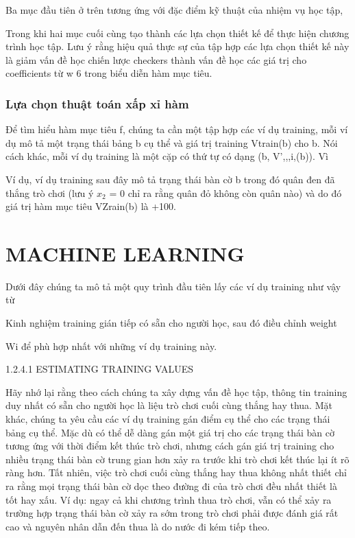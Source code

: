Ba mục đầu tiên ở trên tương ứng với đặc điểm kỹ thuật của nhiệm vụ học tập,

Trong khi hai mục cuối cùng tạo thành các lựa chọn thiết kế để thực hiện chương trình học tập. Lưu ý rằng hiệu quả thực sự của tập hợp các lựa chọn thiết kế này là giảm vấn đề học chiến lược checkers thành vấn đề học các giá trị cho coefficients từ w 6 trong biểu diễn hàm mục tiêu.

\subsubsection{Lựa chọn thuật toán xấp xỉ hàm}

Để tìm hiểu hàm mục tiêu f, chúng ta cần một tập hợp các ví dụ training, mỗi ví dụ mô tả một trạng thái bảng b cụ thể và giá trị training Vtrain(b) cho b. Nói cách khác, mỗi ví dụ training là một cặp có thứ tự có dạng (b, V',,,i,(b)). Vì

Ví dụ, ví dụ training sau đây mô tả trạng thái bàn cờ b trong đó quân đen đã thắng trò chơi (lưu ý $x_{2}$ = 0 chỉ ra rằng quân đỏ không còn quân nào) và do đó giá trị hàm mục tiêu VZrain(b) là +100.

\section{MACHINE LEARNING}

Dưới đây chúng ta mô tả một quy trình đầu tiên lấy các ví dụ training như vậy từ

Kinh nghiệm training gián tiếp có sẵn cho người học, sau đó điều chỉnh weight

Wi để phù hợp nhất với những ví dụ training này.

1.2.4.1 ESTIMATING TRAINING VALUES

Hãy nhớ lại rằng theo cách chúng ta xây dựng vấn đề học tập, thông tin training duy nhất có sẵn cho người học là liệu trò chơi cuối cùng thắng hay thua. Mặt khác, chúng ta yêu cầu các ví dụ training gán điểm cụ thể cho các trạng thái bảng cụ thể. Mặc dù có thể dễ dàng gán một giá trị cho các trạng thái bàn cờ tương ứng với thời điểm kết thúc trò chơi, nhưng cách gán giá trị training cho nhiều trạng thái bàn cờ trung gian hơn xảy ra trước khi trò chơi kết thúc lại ít rõ ràng hơn. Tất nhiên, việc trò chơi cuối cùng thắng hay thua không nhất thiết chỉ ra rằng mọi trạng thái bàn cờ dọc theo đường đi của trò chơi đều nhất thiết là tốt hay xấu. Ví dụ: ngay cả khi chương trình thua trò chơi, vẫn có thể xảy ra trường hợp trạng thái bàn cờ xảy ra sớm trong trò chơi phải được đánh giá rất cao và nguyên nhân dẫn đến thua là do nước đi kém tiếp theo.


